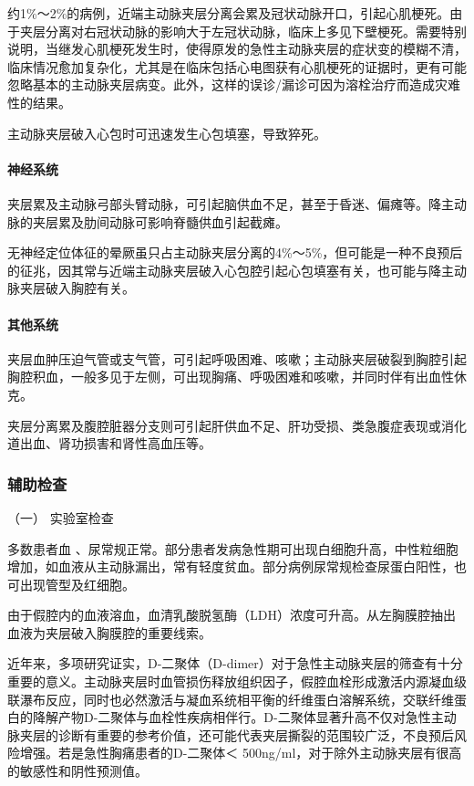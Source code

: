 约1\%～2\%的病例，近端主动脉夹层分离会累及冠状动脉开口，引起心肌梗死。由于夹层分离对右冠状动脉的影响大于左冠状动脉，临床上多见下壁梗死。需要特别说明，当继发心肌梗死发生时，使得原发的急性主动脉夹层的症状变的模糊不清，临床情况愈加复杂化，尤其是在临床包括心电图获有心肌梗死的证据时，更有可能忽略基本的主动脉夹层病变。此外，这样的误诊/漏诊可因为溶栓治疗而造成灾难性的结果。

主动脉夹层破入心包时可迅速发生心包填塞，导致猝死。

\paragraph{神经系统}

夹层累及主动脉弓部头臂动脉，可引起脑供血不足，甚至于昏迷、偏瘫等。降主动脉的夹层累及肋间动脉可影响脊髓供血引起截瘫。

无神经定位体征的晕厥虽只占主动脉夹层分离的4\%～5\%，但可能是一种不良预后的征兆，因其常与近端主动脉夹层破入心包腔引起心包填塞有关，也可能与降主动脉夹层破入胸腔有关。

\paragraph{其他系统}

夹层血肿压迫气管或支气管，可引起呼吸困难、咳嗽；主动脉夹层破裂到胸腔引起胸腔积血，一般多见于左侧，可出现胸痛、呼吸困难和咳嗽，并同时伴有出血性休克。

夹层分离累及腹腔脏器分支则可引起肝供血不足、肝功受损、类急腹症表现或消化道出血、肾功损害和肾性高血压等。

\subsubsection{辅助检查}

\hypertarget{text00314.htmlux5cux23CHP10-9-2-2-1}{}
（一） 实验室检查

多数患者血
、尿常规正常。部分患者发病急性期可出现白细胞升高，中性粒细胞增加，如血液从主动脉漏出，常有轻度贫血。部分病例尿常规检查尿蛋白阳性，也可出现管型及红细胞。

由于假腔内的血液溶血，血清乳酸脱氢酶（LDH）浓度可升高。从左胸膜腔抽出血液为夹层破入胸膜腔的重要线索。

近年来，多项研究证实，D-二聚体（D-dimer）对于急性主动脉夹层的筛查有十分重要的意义。主动脉夹层时血管损伤释放组织因子，假腔血栓形成激活内源凝血级联瀑布反应，同时也必然激活与凝血系统相平衡的纤维蛋白溶解系统，交联纤维蛋白的降解产物D-二聚体与血栓性疾病相伴行。D-二聚体显著升高不仅对急性主动脉夹层的诊断有重要的参考价值，还可能代表夹层撕裂的范围较广泛，不良预后风险增强。若是急性胸痛患者的D-二聚体＜
500ng/ml，对于除外主动脉夹层有很高的敏感性和阴性预测值。

